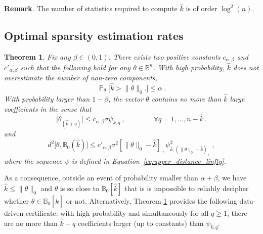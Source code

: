 \documentclass[twoside,11pt]{article}
\newtheorem{thm}{Theorem}
\def\beq{\begin{equation}}
\def\eeq{\end{equation}}
\renewcommand{\P}{\operatorname{\mathbb{P}}}
\newcommand{\<}{\langle}
\renewcommand{\>}{\rangle}
\begin{document}
 \medskip 
 
 \noindent 
 {\bf Remark}. The number of statistics required to compute $\widehat{k}$ is of order $\log^2(n)$.
 

 
 
 \subsection{Optimal sparsity estimation rates}

 
 





 
 
 
\begin{thm}\label{thm:estimation}
Fix any $\beta\in (0,1)$. There exists two positive constants $c_{\alpha,\beta}$ and $c'_{\alpha,\beta}$ such that the following hold for any $\theta\in\mathbb{R}^n$. With high probability, $\widehat{k}$ does not overestimate the number of non-zero components,
\beq\label{eq:level_estimator}
 \P_{\theta}\big[\widehat{k}>\|\theta\|_0\big.
 ]\leq \alpha\ .
\eeq
With probability larger than $1-\beta$, the vector  $\theta$ contains no more than $\widehat{k}$ large coefficients in the sense that 
\beq\label{eq:puissance_estimateur}
 \big|\theta_{(\widehat{k}+q)}\big|\leq c_{\alpha,\beta}\sigma \psi_{\hat{k},q}\ , \quad \quad\quad \quad \forall q=1,\ldots , n-\widehat{k}\ .
\eeq
and 
\beq\label{eq:puissance_estimateur2}
 d^2\big[\theta, \mathbb{B}_0(\widehat{k})\big]\leq c'_{\alpha,\beta}\sigma^2[\|\theta\|_0-\hat{k}]_+\psi^2_{\hat{k},(\|\theta\|_0-\hat{k})_+}\ ,
\eeq
where the sequence $\psi$ is defined in Equation~\eqref{eq:upper_distance_linfty}.
\end{thm}



As a consequence, outside an event of probability smaller than $\alpha+ \beta$, we have $\widehat{k}\leq \|\theta\|_0$ and $\theta$ is so close to $\mathbb{B}_0[\widehat{k}]$ that is is impossible to reliably decipher whether $\theta\in \mathbb{B}_0[\widehat{k}]$ or not. Alternatively, Theorem \ref{thm:estimation} provides the following data-driven certificate: with high probability and simultaneously for all $q\geq 1$, there are no more than $\widehat{k}+q$ coefficients larger (up to constants) than  $\psi_{\widehat{k},q}$. 
\end{document}
